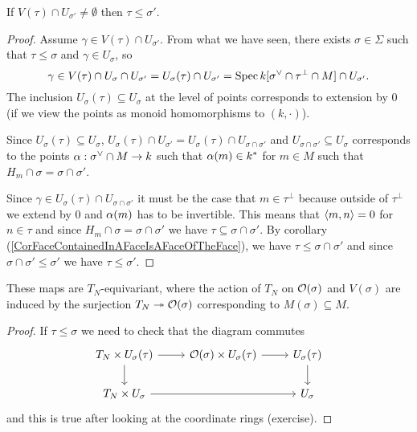 \begin{proposition}[]
If $V(\tau)\cap U_{\sigma'}\neq \emptyset$ then $\tau\leq \sigma'$.
\end{proposition}
\begin{proof}
Assume $\gamma\in V(\tau)\cap U_{\sigma'}$. From what we have seen, there exists $\sigma\in \Sigma$ such that $\tau\leq \sigma$ and $\gamma\in U_\sigma$, so 
\[\gamma\in V(\tau)\cap U_\sigma\cap U_{\sigma'}=U_\sigma(\tau)\cap U_{\sigma'}=\operatorname{Spec} k[\sigma^\vee\cap \tau^\perp\cap M]\cap U_{\sigma'}.\]
The inclusion $U_\sigma(\tau)\subseteq U_\sigma$ at the level of points corresponds to extension by 0 (if we view the points as monoid homomorphisms to $(k,\cdot)$).

Since $U_\sigma(\tau)\subseteq U_\sigma$, $U_\sigma(\tau)\cap U_{\sigma'}=U_\sigma(\tau)\cap U_{\sigma\cap \sigma'}$ and $U_{\sigma\cap\sigma'}\subseteq U_\sigma$ corresponds to the points $\alpha:\sigma^\vee\cap M\to k$ such that $\alpha(m)\in k^\ast$ for $m\in M$ such that $H_m\cap \sigma=\sigma\cap \sigma'$.


Since $\gamma\in U_\sigma(\tau)\cap U_{\sigma\cap \sigma'}$ it must be the case that $m\in \tau^\perp$ because outside of $\tau^\perp$ we extend by $0$ and $\alpha(m)$ has to be invertible. This means that $\left\langle {m,n}\right\rangle=0$ for $n\in \tau$ and since $H_m\cap \sigma=\sigma\cap \sigma'$ we have $\tau\subseteq \sigma\cap \sigma'$. By corollary (\ref{CorFaceContainedInAFaceIsAFaceOfTheFace}), we have $\tau\leq \sigma\cap \sigma'$ and since $\sigma\cap\sigma'\leq \sigma'$ we have $\tau\leq \sigma'$.
\end{proof}


\begin{remark}
These maps are $T_N$-equivariant, where the action of $T_N$ on $\mathcal{O}(\sigma)$ and $V(\sigma)$ are induced by the surjection $T_N\twoheadrightarrow\mathcal{O}(\sigma)$ corresponding to $M(\sigma)\subseteq M$.
\end{remark}
\begin{proof}
If $\tau\leq \sigma$ we need to check that the diagram commutes
\[\begin{tikzcd}
	{T_N\times U_\sigma(\tau)} & {\Oc(\sigma)\times U_\sigma(\tau)} & {U_\sigma(\tau)} \\
	{T_N\times U_\sigma} && {U_\sigma}
	\arrow[from=1-1, to=1-2]
	\arrow[from=1-1, to=2-1]
	\arrow[from=1-2, to=1-3]
	\arrow[from=1-3, to=2-3]
	\arrow[from=2-1, to=2-3]
\end{tikzcd}\]
and this is true after looking at the coordinate rings (exercise).
\end{proof}

